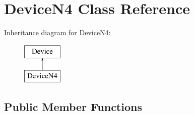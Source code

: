 \hypertarget{class_device_n4}{\section{Device\-N4 Class Reference}
\label{class_device_n4}
}
Inheritance diagram for Device\-N4\-:\begin{figure}[H]
\begin{center}
\leavevmode
\includegraphics[height=2.000000cm]{class_device_n4}
\end{center}
\end{figure}
\subsection*{Public Member Functions}

